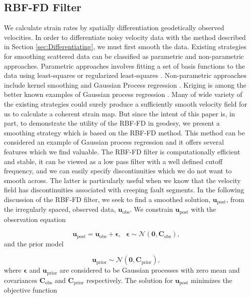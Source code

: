 \documentclass[10pt,a4paper]{article}
\begin{document}
\subsection{RBF-FD Filter}\label{sec:Filter}
We calculate strain rates by spatially differentiation geodetically observed velocities.  In order to differentiate noisy velocity data with the method described in Section \ref{sec:Differentiating}, we must first smooth the data. Existing strategies for smoothing scattered data can be classified as parametric and non-parametric approaches.  Parametric approaches involves fitting a set of basis functions to the data using least-squares or regularized least-squares \citep[e.g.][]{Fasshauer2007}. Non-parametric approaches include kernel smoothing \citep[e.g.][]{Hastie1990} and Gaussian Process regression \citep[e.g.][]{Rasmussen2006}. Kriging is among the better known examples of Gaussian process regression \citep{Matheron1963}.  Many of wide variety of the existing strategies could surely produce a sufficiently smooth velocity field for us to calculate a coherent strain map. But since the intent of this paper is, in part, to demonstrate the utility of the RBF-FD in geodesy, we present a smoothing strategy which is based on the RBF-FD method.  This method can be considered an example of Gaussian process regression and it offers several features which we find valuable.  The RBF-FD filter is computationally efficient and stable, it can be viewed as a low pass filter with a well defined cutoff frequency, and we can easily specify discontinuities which we do not want to smooth across.  The latter is particularly useful when we know that the velocity field has discontinuities associated with creeping fault segments. In the following discussion of the RBF-FD filter, we seek to find a smoothed solution, $\mathbf{u}_\mathrm{post}$, from the irregularly spaced, observed data, $\mathbf{u}_\mathrm{obs}$. We constrain $\mathbf{u}_\mathrm{post}$ with the observation equation

\begin{equation}\label{eq:Data}
  \mathbf{u}_\mathrm{post} = \mathbf{u}_\mathrm{obs} + \mathbf{\epsilon},\ \ \ \mathbf{\epsilon} \sim \mathcal{N}(\mathbf{0},\mathbf{C}_\mathrm{obs}),
\end{equation}
and the prior model

\begin{equation}\label{eq:Prior}
  \mathbf{u}_\mathrm{prior} \sim \mathcal{N}(\mathbf{0},\mathbf{C}_\mathrm{prior}),
\end{equation}
where $\mathbf{\epsilon}$ and $\mathbf{u}_\mathrm{prior}$ are considered to be Gaussian processes with zero mean and covariances $\mathbf{C}_\mathrm{obs}$ and $\mathbf{C}_\mathrm{prior}$ respectively.  The solution for $\mathbf{u}_\mathrm{post}$ minimizes the objective function  
\end{document}
